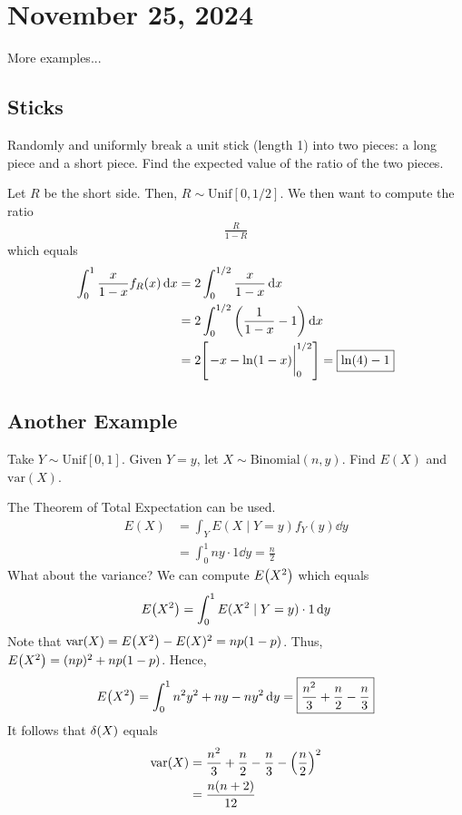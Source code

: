 \section{November 25, 2024}
More examples...

\subsection{Sticks}
\begin{proposition}
    Randomly and uniformly break a unit stick (length 1) into two pieces: a long piece and a short piece. Find the expected value of the ratio of the two pieces.
\end{proposition}
\begin{solution}
    Let $R$ be the short side. Then, $R \sim \text{Unif}[0,1/2]$. We then want to compute the ratio
    \begin{align}
        \frac{R}{1-R}
    \end{align}
    which equals
    \begin{align}
        \int_0^1 \frac{x}{1-x} f_R(x) \dd{x} &= 2 \int_0^{1/2} \frac{x}{1-x} \dd{x}\\
        &= 2 \int_0^{1/2} \qty(\frac{1}{1-x} - 1) \dd{x}\\
        &= 2 \qty[ \eval{ -x - \ln(1-x)}_0^{1/2} ] = \boxed{\ln(4) - 1}
    \end{align}
\end{solution}

\subsection{Another Example}
\begin{proposition}
    Take $Y \sim \text{Unif}[0,1]$. Given $Y = y$, let $X \sim \text{Binomial}(n,y)$. Find $E(X)$ and $\text{var}(X)$.
\end{proposition}
\begin{solution}
    The Theorem of Total Expectation can be used.
    \begin{align}
        E(X) &= \int_Y E(X \mid Y = y) f_Y(y) \dd{y}\\
        &= \int_0^1 ny \cdot 1 \dd{y} = \boxed{\frac{n}{2}}
    \end{align}
    What about the variance? We can compute $E\qty(X^2)$ which equals
    \begin{align}
        E\qty(X^2) = \int_0^1 E(X^2 \mid Y = y) \cdot 1 \dd{y}
    \end{align}
    Note that $\text{var}(X) = E\qty(X^2) - E(X)^2 = np(1-p)$. Thus, $E\qty(X^2) = (np)^2 + np(1-p)$. Hence,
    \begin{align}
        E\qty(X^2) = \int_0^1 n^2y^2 + ny - ny^2 \dd{y} = \boxed{\frac{n^2}{3} + \frac{n}{2} - \frac{n}{3}}
    \end{align}
    It follows that $\var(X)$ equals
    \begin{align}
        \text{var}(X) &= \frac{n^2}{3} + \frac{n}{2} - \frac{n}{3} - \qty(\frac{n}{2})^2\\
        &= \frac{n(n + 2)}{12}  
    \end{align}
\end{solution}


